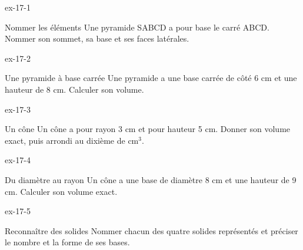\clearpage{}
\begin{blocLivre}{ex-17-1}\begin{exercice}[1]{Nommer les éléments}
Une pyramide SABCD a pour base le carré ABCD. Nommer son sommet, sa base et ses faces latérales.
\label{fig-ex-17-1}
\end{exercice}\end{blocLivre}
\begin{blocLivre}{ex-17-2}\begin{exercice}[1]{Une pyramide à base carrée}
Une pyramide a une base carrée de côté 6 cm et une hauteur de 8 cm. Calculer son volume.
\label{fig-ex-17-2}
\end{exercice}\end{blocLivre}
\begin{blocLivre}{ex-17-3}\begin{exercice}[1]{Un cône}
Un cône a pour rayon 3 cm et pour hauteur 5 cm. Donner son volume exact, puis arrondi au dixième de cm$^3$.
\label{fig-ex-17-3}
\end{exercice}\end{blocLivre}
\begin{blocLivre}{ex-17-4}\begin{exercice}[1]{Du diamètre au rayon}
Un cône a une base de diamètre 8 cm et une hauteur de 9 cm. Calculer son volume exact.
\label{fig-ex-17-4}
\end{exercice}\end{blocLivre}
\begin{blocLivre}{ex-17-5}\begin{exercice}[1]{Reconnaître des solides}
Nommer chacun des quatre solides représentés et préciser le nombre et la forme de ses bases.
\label{fig-ex-17-5}
\end{exercice}\end{blocLivre}

